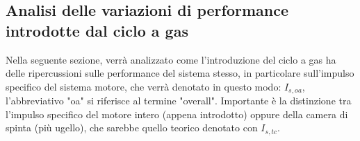 
\subsection{Analisi delle variazioni di performance introdotte dal ciclo a gas}
Nella seguente sezione, verrà analizzato come l'introduzione del ciclo a gas ha delle ripercussioni sulle performance del sistema stesso, in particolare sull'impulso specifico del sistema motore, che verrà denotato in questo modo: $I_{s,oa}$, l'abbreviativo "oa" si riferisce al termine "overall". Importante è la distinzione tra l'impulso specifico del motore intero (appena introdotto) oppure della camera di spinta (più ugello), che sarebbe quello teorico denotato con $I_{s,tc}$.  

